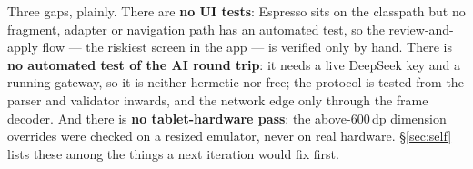 Three gaps, plainly. There are \textbf{no UI tests}: Espresso sits on the  classpath
but no fragment, adapter or navigation path has an automated test, so the review-and-apply flow --- the
riskiest screen in the app --- is verified only by hand. There is \textbf{no automated test of the AI
round trip}: it needs a live DeepSeek key and a running gateway, so it is neither hermetic nor free;
the protocol is tested from the parser and validator inwards, and the network edge only through the
frame decoder. And there is \textbf{no tablet-hardware pass}: the above-600\,dp dimension overrides
were checked on a resized emulator, never on real hardware. \S\ref{sec:self} lists these among the
things a next iteration would fix first.
